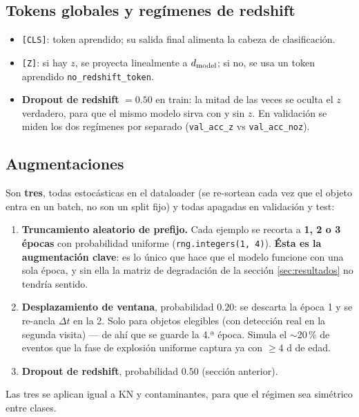 \documentclass[11pt,a4paper]{article}
\newcommand{\code}[1]{\texttt{\small #1}}
\begin{document}
\subsection{Tokens globales y regímenes de redshift}
\begin{itemize}[nosep]
  \item \code{[CLS]}: token aprendido; su salida final alimenta la cabeza de clasificación.
  \item \code{[Z]}: si hay $z$, se proyecta linealmente a $d_{\rm model}$; si no, se usa un token
        aprendido \code{no\_redshift\_token}.
  \item \textbf{Dropout de redshift} $=0.50$ en train: la mitad de las veces se oculta el $z$
        verdadero, para que el mismo modelo sirva con y sin $z$. En validación se miden los dos
        regímenes por separado (\code{val\_acc\_z} vs \code{val\_acc\_noz}).
\end{itemize}

\subsection{Augmentaciones}
Son \textbf{tres}, todas estocásticas en el dataloader (se re-sortean cada vez que el objeto entra
en un batch, no son un split fijo) y todas apagadas en validación y test:

\begin{enumerate}[nosep]
  \item \textbf{Truncamiento aleatorio de prefijo.} Cada ejemplo se recorta a \textbf{1, 2 o 3
        épocas} con probabilidad uniforme (\code{rng.integers(1, 4)}). \textbf{Ésta es la
        augmentación clave}: es lo único que hace que el modelo funcione con una sola época, y sin
        ella la matriz de degradación de la sección \ref{sec:resultados} no tendría sentido.
  \item \textbf{Desplazamiento de ventana}, probabilidad $0.20$: se descarta la época 1 y se re-ancla
        $\Delta t$ en la 2. Solo para objetos elegibles (con detección real en la segunda visita)
        --- de ahí que se guarde la 4.ª época. Simula el $\sim$20\,\% de eventos que la fase de
        explosión uniforme captura ya con $\ge$4 d de edad.
  \item \textbf{Dropout de redshift}, probabilidad $0.50$ (sección anterior).
\end{enumerate}

\noindent Las tres se aplican igual a KN y contaminantes, para que el régimen sea simétrico entre
clases.
\end{document}

